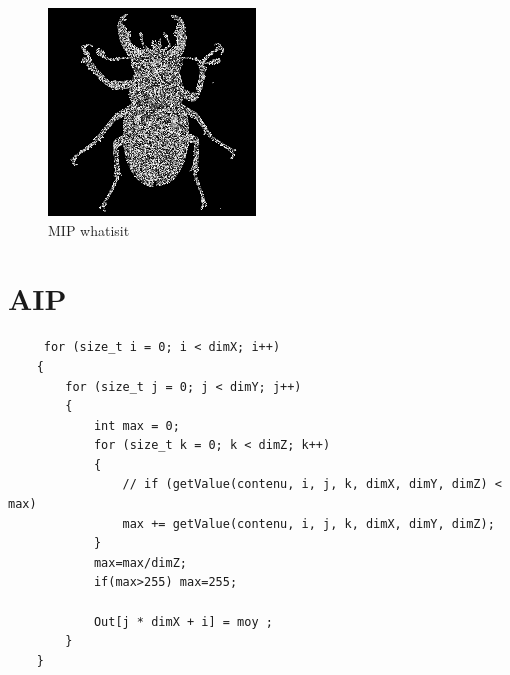 \documentclass{article}
\begin{document}
\begin{figure}[h]
\centerline{\includegraphics[scale=0.7]{./sortieWhatisit.png}}
\caption{MIP whatisit}
\end{figure}

\newpage
\section{AIP}

\begin{lstlisting}
     for (size_t i = 0; i < dimX; i++)
    {
        for (size_t j = 0; j < dimY; j++)
        {
            int max = 0;
            for (size_t k = 0; k < dimZ; k++)
            {
                // if (getValue(contenu, i, j, k, dimX, dimY, dimZ) < max)
                max += getValue(contenu, i, j, k, dimX, dimY, dimZ);
            }
            max=max/dimZ;
            if(max>255) max=255;
           
            Out[j * dimX + i] = moy ;
        }
    }

\end{lstlisting}
\end{document}
